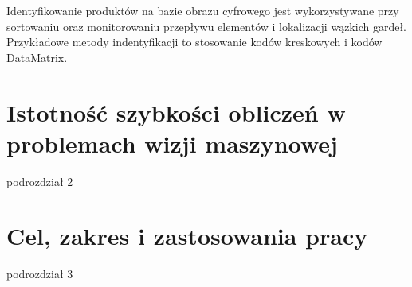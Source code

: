 \documentclass[document.tex]{subfiles}
\begin{document}
	\indent Identyfikowanie produktów na bazie obrazu cyfrowego jest wykorzystywane przy sortowaniu
	oraz monitorowaniu przepływu elementów i lokalizacji wązkich gardeł.
	Przykładowe metody indentyfikacji to stosowanie kodów kreskowych i kodów DataMatrix.\cite{Machine_Vision_Intro}


\section{Istotność szybkości obliczeń w problemach wizji maszynowej}
podrozdział 2 \cite{Mazurek_Robot_Viterbi}
\section{Cel, zakres i zastosowania pracy}
podrozdział 3
\end{document}
